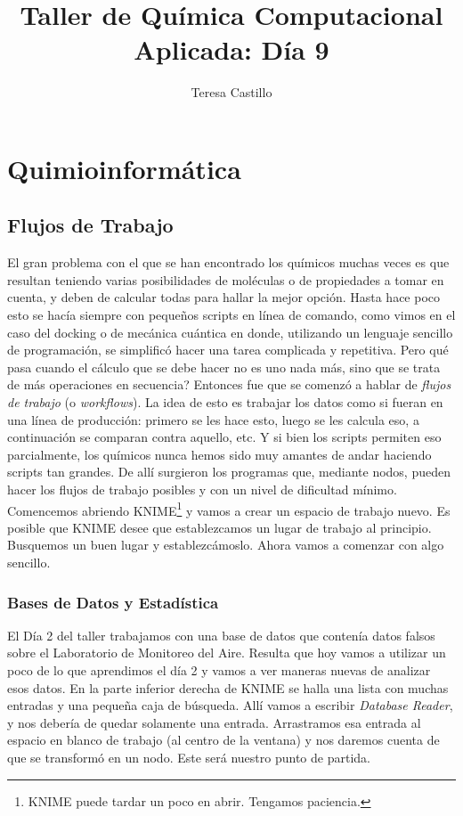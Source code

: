 \documentclass[10pt,letterpaper]{article}
\author{Teresa Castillo}
\title{Taller de Qu\'imica Computacional Aplicada: D\'ia 9}
\begin{document}
\maketitle

\section{Quimioinform\'atica}


\subsection{Flujos de Trabajo}
El gran problema con el que se han encontrado los qu\'imicos muchas veces es que resultan teniendo varias posibilidades de mol\'eculas o de propiedades a tomar en cuenta, y deben de calcular todas para hallar la mejor opci\'on. Hasta hace poco esto se hac\'ia siempre con peque\~nos scripts en l\'inea de comando, como vimos en el caso del docking o de mec\'anica cu\'antica en donde, utilizando un lenguaje sencillo de programaci\'on, se simplific\'o hacer una tarea complicada y repetitiva. Pero qu\'e pasa cuando el c\'alculo que se debe hacer no es uno nada m\'as, sino que se trata de m\'as operaciones en secuencia? Entonces fue que se comenz\'o a hablar de \emph{flujos de trabajo} (o \emph{workflows}). La idea de esto es trabajar los datos como si fueran en una l\'inea de producci\'on: primero se les hace esto, luego se les calcula eso, a continuaci\'on se comparan contra aquello, etc. Y si bien los scripts permiten eso parcialmente, los qu\'imicos nunca hemos sido muy amantes de andar haciendo scripts tan grandes. De all\'i surgieron los programas que, mediante nodos, pueden hacer los flujos de trabajo posibles y con un nivel de dificultad m\'inimo.\\

Comencemos abriendo KNIME\footnote{KNIME puede tardar un poco en abrir. Tengamos paciencia.} y vamos a crear un espacio de trabajo nuevo. Es posible que KNIME desee que establezcamos un lugar de trabajo al principio. Busquemos un buen lugar y establezc\'amoslo. Ahora vamos a comenzar con algo sencillo.

\subsubsection{Bases de Datos y Estad\'istica}

El D\'ia 2 del taller trabajamos con una base de datos que conten\'ia datos falsos sobre el Laboratorio de Monitoreo del Aire. Resulta que hoy vamos a utilizar un poco de lo que aprendimos el d\'ia 2 y vamos a ver maneras nuevas de analizar esos datos. En la parte inferior derecha de KNIME se halla una lista con muchas entradas y una peque\~na caja de b\'usqueda. All\'i vamos a escribir \emph{Database Reader}, y nos deber\'ia de quedar solamente una entrada. Arrastramos esa entrada al espacio en blanco de trabajo (al centro de la ventana) y nos daremos cuenta de que se transform\'o en un nodo. Este ser\'a nuestro punto de partida.\\
\end{document}
